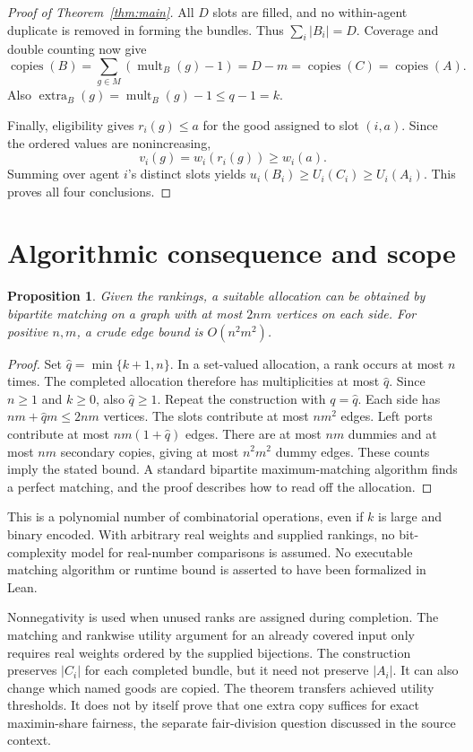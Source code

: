 \documentclass[11pt,a4paper]{article}
\newtheorem{proposition}[theorem]{Proposition}
\newcommand{\mult}{\operatorname{mult}}
\newcommand{\extra}{\operatorname{extra}}
\newcommand{\copies}{\operatorname{copies}}
\begin{document}
\begin{proof}[Proof of Theorem~\ref{thm:main}]
All $D$ slots are filled, and no within-agent duplicate is removed in
forming the bundles. Thus $\sum_i|B_i|=D$. Coverage and double counting now
give
\[
 \copies(B)=\sum_{g\in M}(\mult_B(g)-1)=D-m
 =\copies(C)=\copies(A).
\]
Also $\extra_B(g)=\mult_B(g)-1\le q-1=k$.

Finally, eligibility gives $r_i(g)\le a$ for the good assigned to slot
$(i,a)$. Since the ordered values are nonincreasing,
\[
 v_i(g)=w_i(r_i(g))\ge w_i(a).
\]
Summing over agent $i$'s distinct slots yields
$u_i(B_i)\ge U_i(C_i)\ge U_i(A_i)$. This proves all four conclusions.
\end{proof}

\section{Algorithmic consequence and scope}
\begin{proposition}\label{prop:algorithm}
Given the rankings, a suitable allocation can be obtained by bipartite
matching on a graph with at most $2nm$ vertices on each side. For positive
$n,m$, a crude edge bound is $O(n^2m^2)$.
\end{proposition}
\begin{proof}
Set $\widehat q=\min\{k+1,n\}$. In a set-valued allocation, a rank occurs
at most $n$ times. The completed allocation therefore has multiplicities
at most $\widehat q$. Since $n\ge1$ and $k\ge0$, also $\widehat q\ge1$.
Repeat the construction with $q=\widehat q$.
Each side has $nm+\widehat q m\le2nm$ vertices. The slots contribute at
most $nm^2$ edges. Left ports contribute at most $nm(1+\widehat q)$ edges.
There are at most $nm$ dummies and at most $nm$ secondary copies, giving
at most $n^2m^2$ dummy edges. These counts imply the stated bound.
A standard bipartite maximum-matching algorithm finds a perfect matching,
and the proof describes how to read off the allocation.
\end{proof}

This is a polynomial number of combinatorial operations, even if $k$ is
large and binary encoded. With arbitrary real weights and supplied
rankings, no bit-complexity model for real-number comparisons is assumed.
No executable matching algorithm or runtime bound is asserted to have been
formalized in Lean.

Nonnegativity is used when unused ranks are assigned during completion.
The matching and rankwise utility argument for an already covered input
only requires real weights ordered by the supplied bijections.
The construction preserves $|C_i|$ for each completed bundle, but it need
not preserve $|A_i|$. It can also change which named goods are copied.
The theorem transfers achieved utility thresholds. It does not by itself
prove that one extra copy suffices for exact maximin-share fairness, the
separate fair-division question discussed in the source context.
\end{document}
